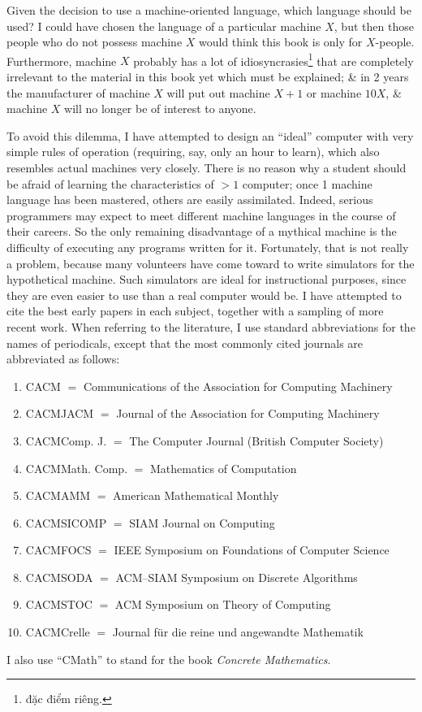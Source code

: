 \documentclass{article}
\begin{document}
Given the decision to use a machine-oriented language, which language should be used? I could have chosen the language of a particular machine $X$, but then those people who do not possess machine $X$ would think this book is only for $X$-people. Furthermore, machine $X$ probably has a lot of idiosyncrasies\footnote{đặc điểm riêng.} that are completely irrelevant to the material in this book yet which must be explained; \& in 2 years the manufacturer of machine $X$ will put out machine $X + 1$ or machine $10X$, \& machine $X$ will no longer be of interest to anyone.

To avoid this dilemma, I have attempted to design an ``ideal'' computer with very simple rules of operation (requiring, say, only an hour to learn), which also resembles actual machines very closely. There is no reason why a student should be afraid of learning the characteristics of $> 1$ computer; once 1 machine language has been mastered, others are easily assimilated. Indeed, serious programmers may expect to meet different machine languages in the course of their careers. So the only remaining disadvantage of a mythical machine is the difficulty of executing any programs written for it. Fortunately, that is not really a problem, because many volunteers have come toward to write simulators for the hypothetical machine. Such simulators are ideal for instructional purposes, since they are even easier to use than a real computer would be. I have attempted to cite the best early papers in each subject, together with a sampling of more recent work. When referring to the literature, I use standard abbreviations for the names of periodicals, except that the most commonly cited journals are abbreviated as follows:
\begin{enumerate}
	\item CACM $=$ Communications of the Association for Computing Machinery
	\item CACMJACM $=$ Journal of the Association for Computing Machinery
	\item CACMComp. J. $=$ The Computer Journal (British Computer Society)
	\item CACMMath. Comp. $=$ Mathematics of Computation
	\item CACMAMM $=$ American Mathematical Monthly
	\item CACMSICOMP $=$ SIAM Journal on Computing
	\item CACMFOCS $=$ IEEE Symposium on Foundations of Computer Science
	\item CACMSODA $=$ ACM–SIAM Symposium on Discrete Algorithms
	\item CACMSTOC $=$ ACM Symposium on Theory of Computing
	\item CACMCrelle $=$ Journal für die reine und angewandte Mathematik
\end{enumerate}
I also use ``CMath'' to stand for the book {\it Concrete Mathematics}.
\end{document}
